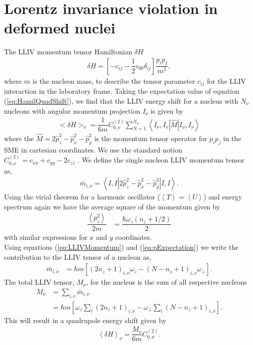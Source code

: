 \documentclass[10pt,a4paper, twoside]{report}
\begin{document}
\section{Lorentz invariance violation  in deformed nuclei} 
The LLIV momentum tensor Hamiltonian $\delta H$  \cite{Kostelecky1999}
\begin{align} \label{eq:HamilQuadShift}
\delta H = \left[-c_{ij} -\dfrac{1}{2}c_{00}\delta_{ij}\right]\dfrac{p_ip_j}{m^2},
\end{align}
 where $m$ is the nucleon mass,  to describe the tensor parameter $c_{ij}$  for the LLIV interaction \cite{Kostelecky1999} in the laboratory frame. 
Taking the expectation value of equation (\ref{eq:HamilQuadShift}), we find that the LLIV energy shift  for a nucleus with $N_{\nu}$ nucleons with angular momentum projection $I_{\nu}$ is given by 
\begin{align} \label{eq:MomentumEnergyShift}
<\delta H>_{\nu} = \dfrac{1}{6m}C_{0, \nu}^{(2)}\sum_{N=1}^{N_{\nu}}\left<I_{\nu},I_{\nu}\left|\hat{M}\right|I_{\nu},I_{\nu}\right> 
\end{align}
where the $\hat{M} = 2\hat{p}_z^2 - \hat{p}_x^2 - \hat{p}_y^2$ is the momentum tensor operator for $p_ip_j$ in the SME in cartesian coordinates. We use the standard notion $C_{0, \nu}^{(2)} = c_{xx} + c_{yy} -2c_{zz}$ \cite{Kostelecky1999}. We define the single nucleon LLIV momentum tensor as,
\begin{align} \label{eq:LLIVMomentum}
\bar{m}_{i, \nu} =  \left<I,I\left|2\hat{p}_z^2 - \hat{p}_x^2 - \hat{p}_y^2\right|I,I\right>.
\end{align}
Using the virial theorem for a harmonic oscillator ($\left<T\right>=\left<U\right>$) and energy spectrum again we have the average square of the momentum given by
\begin{align} 
\dfrac{\left<p_z^2\right>}{2m} &= \dfrac{\hbar\omega_z\left(n_z + 1/2\right)}{2} \label{eq:pExpectation}
\end{align}
with similar expressions for $x$ and $y$ coordinates. \\
\linebreak
Using equations (\ref{eq:LLIVMomentum}) and (\ref{eq:pExpectation}) we write the contribution to the LLIV tensor of a nucleon as,
\begin{align} \label{eq:MDimensionful}
\bar{m}_{i,\nu} &= \hbar m\left[\left(2n_z + 1\right)_{i,\nu}\omega_z - \left(N - n_z + 1\right)_{i,\nu}\omega_{\perp}\right].
\end{align}
The total LLIV tensor, $M_{\nu}$,  for the nucleus is the sum of all respective nucleons
\begin{align}
M_{\nu} &= \sum_{i,\nu} \bar{m}_{i,\nu} \nonumber \\
&= \hbar m\left[\omega_z\sum_{i}\left(2n_z + 1\right)_{i,\nu} - \omega_{\perp}\sum_{i}\left(N - n_z + 1\right)_{i,\nu}\right]. \label{eq:CollectiveQDim}
\end{align}
This will result in a quadrupole energy shift given by
\begin{align} \label{eq:LLIVEnergyShift}
\left<\delta H\right>_{\nu} = \dfrac{M_{\nu}}{6m} C_{0,\nu}^{(2)}.
\end{align}
\end{document}
